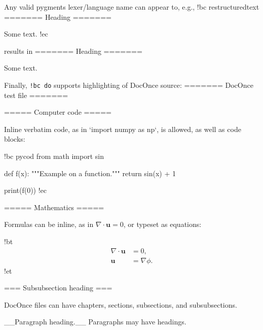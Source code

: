 \documentclass[%
oneside,                 %
final,                   %
10pt]{article}
\theoremstyle{definition}
\begin{document}
Any valid pygments lexer/language name can appear to, e.g.,
\bdo
!bc restructuredtext
=======
Heading
=======

Some text.
!ec

\edo

results in
\brestructuredtext
=======
Heading
=======

Some text.

\erestructuredtext

Finally, \Verb?!bc do? supports highlighting of DocOnce source:
\bdo
======= DocOnce test file =======

===== Computer code =====

Inline verbatim code, as in `import numpy as np`, is allowed, as well as
code blocks:

!bc pycod
from math import sin

def f(x):
    """Example on a function."""
    return sin(x) + 1

print(f(0))
!ec


===== Mathematics =====

Formulas can be inline, as in $\nabla\cdot\bm{u} = 0$, or typeset
as equations:

!bt
\begin{align*}
\nabla\cdot\bm{u} &= 0,\\ 
\bm{u} &= \nabla\phi .
\end{align*}
!et

=== Subsubsection heading ===

DocOnce files can have chapters, sections, subsections, and subsubsections.

__Paragraph heading.__ Paragraphs may have headings.

\edo
\end{document}
